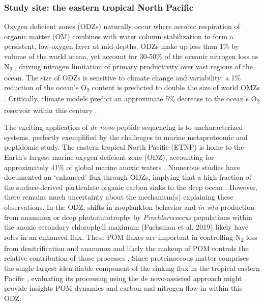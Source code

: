 \documentclass[12pt, letterpaper, twoside]{article}
\begin{document}
\subsubsection{Study site: the eastern tropical North Pacific}

Oxygen deficient zones (ODZs) naturally occur where aerobic respiration of organic matter (OM) combines with water column stabilization to form a persistent, low-oxygen layer at mid-depths. ODZs make up less than 1\% by volume of the world ocean, yet account for 30-50\% of the oceanic nitrogen loss as N\textsubscript{2} \cite{devries_marine_2013}, driving nitrogen limitation of primary productivity over vast regions of the ocean. The size of ODZs is sensitive to climate change and variability: a 1\% reduction of the ocean’s  O\textsubscript{2} content is predicted to double the size of world OMZs \cite{deutsch_climate-forced_2011}. Critically, climate models predict an approximate 5\% decrease to the ocean’s O\textsubscript{2} reservoir within this century \cite{bopp_multiple_2013}. 

The exciting application of \textit{de novo} peptide sequencing is to uncharacterized systems, perfectly exemplified by the challenges to marine metaproteomic and peptidomic study. The eastern tropical North Pacific (ETNP) is home to the Earth’s largest marine oxygen deficient zone (ODZ), accounting for approximately 41\% of global marine anoxic waters \cite{paulmier_oxygen_2009}. Numerous studies have documented an ‘enhanced’ flux through ODZs, implying that a high fraction of the surface-derived particulate organic carbon sinks to the deep ocean \cite{devol_role_2001, van_mooy_impact_2002, keil_multiproxy_2016}. However, there remains much uncertainty about the mechanism(s) explaining these observations. In the ODZ, shifts in zooplankton behavior \cite{keil_multiproxy_2016} and \textit{in situ} production from anammox \cite{ganesh_single_2018} or deep photoautotrophy by \textit{Prochlorococcus} populations within the anoxic secondary chlorophyll maximum (Fuchsman et al. 2019) likely have roles in an enhanced flux. These POM fluxes are important in controlling N\textsubscript{2} loss from denitrification and anammox \cite{fuchsman_cyanobacteria_2019} and likely the makeup of POM controls the relative contribution of those processes \cite{babbin_organic_2014}. Since proteinaceous matter comprises the single largest identifiable component of the sinking flux in the tropical eastern Pacific \cite{wakeham_molecular_1997}, evaluating its processing using the de novo-assisted approach might provide insights POM dynamics and carbon and nitrogen flow in within this ODZ. 
\end{document}
